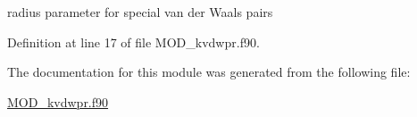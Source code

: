 radius parameter for special van der Waals pairs 



Definition at line 17 of file M\-O\-D\-\_\-kvdwpr.\-f90.



The documentation for this module was generated from the following file\-:\begin{DoxyCompactItemize}
\item 
\hyperlink{MOD__kvdwpr_8f90}{M\-O\-D\-\_\-kvdwpr.\-f90}\end{DoxyCompactItemize}
